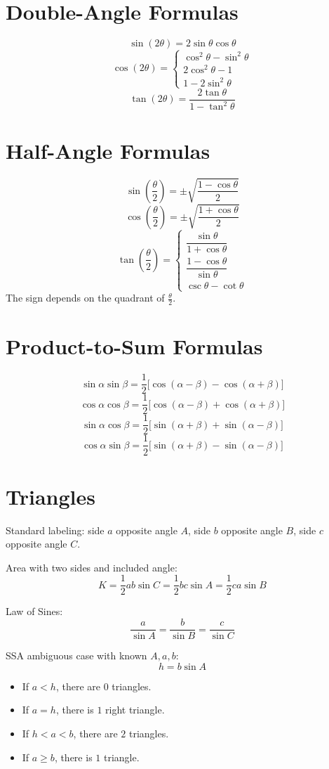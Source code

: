 \documentclass[11pt]{article}
\begin{document}
\section*{Double-Angle Formulas}
\[
\sin(2\theta)=2\sin\theta\cos\theta
\]
\[
\cos(2\theta)=
\begin{cases}
\cos^2\theta-\sin^2\theta\\
2\cos^2\theta-1\\
1-2\sin^2\theta
\end{cases}
\]
\[
\tan(2\theta)=\frac{2\tan\theta}{1-\tan^2\theta}
\]

\section*{Half-Angle Formulas}
\[
\sin\left(\frac{\theta}{2}\right)=\pm\sqrt{\frac{1-\cos\theta}{2}}
\]
\[
\cos\left(\frac{\theta}{2}\right)=\pm\sqrt{\frac{1+\cos\theta}{2}}
\]
\[
\tan\left(\frac{\theta}{2}\right)=
\begin{cases}
\dfrac{\sin\theta}{1+\cos\theta}\\[0.6em]
\dfrac{1-\cos\theta}{\sin\theta}\\[0.6em]
\csc\theta-\cot\theta
\end{cases}
\]
The sign depends on the quadrant of $\frac{\theta}{2}$.

\section*{Product-to-Sum Formulas}
\[
\sin\alpha\sin\beta=\frac12\bigl[\cos(\alpha-\beta)-\cos(\alpha+\beta)\bigr]
\]
\[
\cos\alpha\cos\beta=\frac12\bigl[\cos(\alpha-\beta)+\cos(\alpha+\beta)\bigr]
\]
\[
\sin\alpha\cos\beta=\frac12\bigl[\sin(\alpha+\beta)+\sin(\alpha-\beta)\bigr]
\]
\[
\cos\alpha\sin\beta=\frac12\bigl[\sin(\alpha+\beta)-\sin(\alpha-\beta)\bigr]
\]

\section*{Triangles}
Standard labeling: side $a$ opposite angle $A$, side $b$ opposite angle $B$, side $c$ opposite angle $C$.

Area with two sides and included angle:
\[
K=\frac12 ab\sin C=\frac12 bc\sin A=\frac12 ca\sin B
\]

Law of Sines:
\[
\frac{a}{\sin A}=\frac{b}{\sin B}=\frac{c}{\sin C}
\]

SSA ambiguous case with known $A,a,b$:
\[
h=b\sin A
\]
\begin{itemize}
  \item If $a<h$, there are $0$ triangles.
  \item If $a=h$, there is $1$ right triangle.
  \item If $h<a<b$, there are $2$ triangles.
  \item If $a\ge b$, there is $1$ triangle.
\end{itemize}
\end{document}
